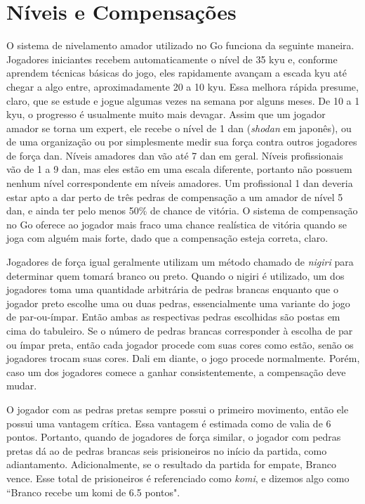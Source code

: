 \chapter{Níveis e Compensações}\label{chap:10:niveis_compensacoes}

O sistema de nivelamento amador utilizado no Go funciona da seguinte maneira. Jogadores iniciantes recebem automaticamente o nível de 35 kyu e, conforme aprendem técnicas básicas do jogo, eles rapidamente avançam a escada kyu até chegar a algo entre, aproximadamente 20 a 10 kyu. Essa melhora rápida presume, claro, que se estude e jogue algumas vezes na semana por alguns meses. De 10 a 1 kyu, o progresso é usualmente muito mais devagar. Assim que um jogador amador se torna um expert, ele recebe o nível de 1 dan (\emph{shodan} em japonês), ou de uma organização ou por simplesmente medir sua força contra outros jogadores de força dan. Níveis amadores dan vão até 7 dan em geral. Níveis profissionais vão de 1 a 9 dan, mas eles estão em uma escala diferente, portanto não possuem nenhum nível correspondente em níveis amadores. Um profissional 1 dan deveria estar apto a dar perto de três pedras de compensação a um amador de nível 5 dan, e ainda ter pelo menos 50\% de chance de vitória. O sistema de compensação no Go oferece ao jogador mais fraco uma chance realística de vitória quando se joga com alguém mais forte, dado que a compensação esteja correta, claro.

Jogadores de força igual geralmente utilizam um método chamado de \emph{nigiri} para determinar quem tomará branco ou preto. Quando o nigiri é utilizado, um dos jogadores toma uma quantidade arbitrária de pedras brancas enquanto que o jogador preto escolhe uma ou duas pedras, essencialmente uma variante do jogo de par-ou-ímpar. Então ambas as respectivas pedras escolhidas são postas em cima do tabuleiro. Se o número de pedras brancas corresponder à escolha de par ou ímpar preta, então cada jogador procede com suas cores como estão, senão os jogadores trocam suas cores. Dali em diante, o jogo procede normalmente. Porém, caso um dos jogadores comece a ganhar consistentemente, a compensação deve mudar.

O jogador com as pedras pretas sempre possui o primeiro movimento, então ele possui uma vantagem crítica. Essa vantagem é estimada como de valia de 6 pontos. Portanto, quando de jogadores de força similar, o jogador com pedras pretas dá ao de pedras brancas seis prisioneiros no início da partida, como adiantamento. Adicionalmente, se o resultado da partida for empate, Branco vence. Esse total de prisioneiros é referenciado como \emph{komi}, e dizemos algo como ``Branco recebe um komi de 6.5 pontos".

